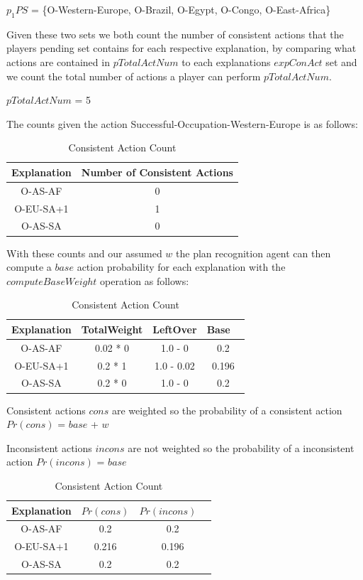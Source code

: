 \documentclass[parskip]{cs4rep}
\begin{document}
\centerline{
$p_1PS$ = \{O-Western-Europe, O-Brazil, O-Egypt, O-Congo, O-East-Africa\}
}

Given these two sets we both count the number of consistent actions that the players pending set contains for each respective explanation, by comparing what actions are contained in $pTotalActNum$ to each explanations $expConAct$ set and we count the total number of actions a player can perform $pTotalActNum$.

$pTotalActNum$ = 5

The counts given the action Successful-Occupation-Western-Europe is as follows:

\begin{table}[ht]
\centering
\begin{tabular}{|c|c|}
\hline 
\textbf{Explanation} & \textbf{Number of Consistent Actions} \\ 
\hline 
O-AS-AF & 0 \\ 
\hline 
O-EU-SA+1 & 1 \\ 
\hline 
O-AS-SA & 0 \\ 
\hline 
\end{tabular}
\caption{Consistent Action Count}
\label{table:territory-actions-bonus}
\end{table}

With these counts and our assumed $w$ the plan recognition agent can then compute a $base$ action probability for each explanation with the $computeBaseWeight$ operation as follows:

\begin{table}[ht]
\centering
\begin{tabular}{|c|c|c|c|}
\hline 
\textbf{Explanation} & TotalWeight & LeftOver & Base \ \\ 
\hline 
O-AS-AF & 0.02 * 0 & 1.0 - 0 & 0.2 \\ 
\hline 
O-EU-SA+1 & 0.2 * 1 & 1.0 - 0.02 & 0.196 \\ 
\hline 
O-AS-SA & 0.2 * 0 & 1.0 - 0 & 0.2 \\ 
\hline 
\end{tabular}
\caption{Consistent Action Count}
\label{table:territory-actions-bonus}
\end{table}

Consistent actions $cons$ are weighted so the probability of a consistent action $Pr(cons)$ = $base$ + $w$

Inconsistent actions $incons$ are not weighted so the probability of a inconsistent action $Pr(incons)$ = $base$

\begin{table}[ht]
\centering
\begin{tabular}{|c|c|c|}
\hline 
\textbf{Explanation} & $Pr(cons)$ & $Pr(incons)$ \ \\ 
\hline 
O-AS-AF & 0.2 & 0.2 \\ 
\hline 
O-EU-SA+1 & 0.216 & 0.196 \\ 
\hline 
O-AS-SA & 0.2 & 0.2 \\ 
\hline 
\end{tabular}
\caption{Consistent Action Count}
\label{table:territory-actions-bonus}
\end{table}
\end{document}
